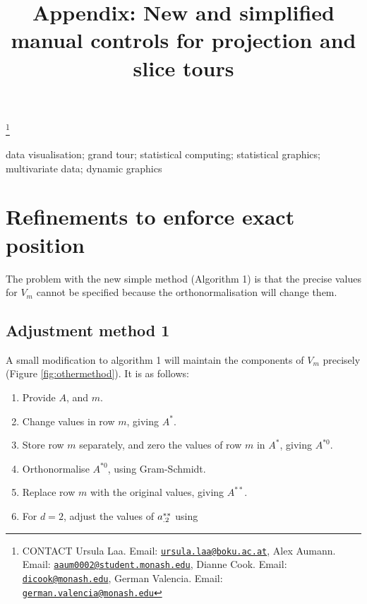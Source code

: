 \documentclass[]{interact}
\theoremstyle{plain}%
\theoremstyle{definition}
\theoremstyle{remark}
\providecommand{\tightlist}{%
  \setlength{\itemsep}{0pt}\setlength{\parskip}{0pt}}
\def\tightlist{}
\begin{document}

\title{Appendix: New and simplified manual controls for projection and
slice tours}


\author{
}

\thanks{CONTACT Ursula
Laa. Email: \href{mailto:ursula.laa@boku.ac.at}{\nolinkurl{ursula.laa@boku.ac.at}}, Alex
Aumann. Email: \href{mailto:aaum0002@student.monash.edu}{\nolinkurl{aaum0002@student.monash.edu}}, Dianne
Cook. Email: \href{mailto:dicook@monash.edu}{\nolinkurl{dicook@monash.edu}}, German
Valencia. Email: \href{mailto:german.valencia@monash.edu}{\nolinkurl{german.valencia@monash.edu}}}

\maketitle


\begin{keywords}
data visualisation; grand tour; statistical computing; statistical
graphics; multivariate data; dynamic graphics
\end{keywords}

\hypertarget{refinements-to-enforce-exact-position}{%
\section{Refinements to enforce exact
position}\label{refinements-to-enforce-exact-position}}

The problem with the new simple method (Algorithm 1) is that the precise
values for \(V_m\) cannot be specified because the orthonormalisation
will change them.

\hypertarget{adjustment-method-1}{%
\subsection{Adjustment method 1}\label{adjustment-method-1}}

A small modification to algorithm 1 will maintain the components of
\(V_m\) precisely (Figure \ref{fig:othermethod}). It is as follows:

\begin{enumerate}
\def\labelenumi{\arabic{enumi}.}
\tightlist
\item
  Provide \(A\), and \(m\).
\item
  Change values in row \(m\), giving \(A^*\).
\item
  Store row \(m\) separately, and zero the values of row \(m\) in
  \(A^*\), giving \(A^{*0}\).
\item
  Orthonormalise \(A^{*0}\), using Gram-Schmidt.
\item
  Replace row \(m\) with the original values, giving \(A^{**}\).
\item
  For \(d=2\), adjust the values of \({\boldmath a}^{**}_{.2}\) using
\end{enumerate}
\end{document}
